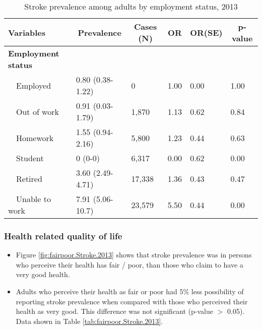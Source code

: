\begin{table}[H]
\caption{Stroke prevalence  among adults by employment status, 2013\label{tab:employ.Stroke.2013}} 
\begin{center}
\begin{tabular}{llllll}
\hline\hline
\multicolumn{1}{l}{Variables}&\multicolumn{1}{c}{Prevalence}&\multicolumn{1}{c}{Cases (N)}&\multicolumn{1}{c}{OR}&\multicolumn{1}{c}{OR(SE)}&\multicolumn{1}{c}{p-value}\tabularnewline
\hline
{\bfseries Employment status}&&&&&\tabularnewline
~~Employed&0.80 (0.38-1.22)&     0&1.00&0.00&1.00\tabularnewline
~~Out of work&0.91 (0.03-1.79)& 1,870&1.13&0.62&0.84\tabularnewline
~~Homework&1.55 (0.94-2.16)& 5,800&1.23&0.44&0.63\tabularnewline
~~Student&0 (0-0)& 6,317&0.00&0.62&0.00\tabularnewline
~~Retired&3.60 (2.49-4.71)&17,338&1.36&0.43&0.47\tabularnewline
~~Unable to work&7.91 (5.06-10.7)&23,579&5.50&0.44&0.00\tabularnewline
\hline
\end{tabular}\end{center}

\end{table}


 \newpage
\subsubsection{Health related quality of life}


 \begin{itemize}

\item Figure \ref{fig:fairpoor.Stroke.2013} shows that stroke prevalence  was 
 in persons who perceive their health has fair / poor,
than those who claim to have a very good health.

\item Adults who perceive their health as fair or poor had 5\% less possibility of reporting stroke prevalence when compared with those who perceived their health as very good. This difference was not significant (p-value $>$ 0.05). Data shown in Table \ref{tab:fairpoor.Stroke.2013}.

\end{itemize}

